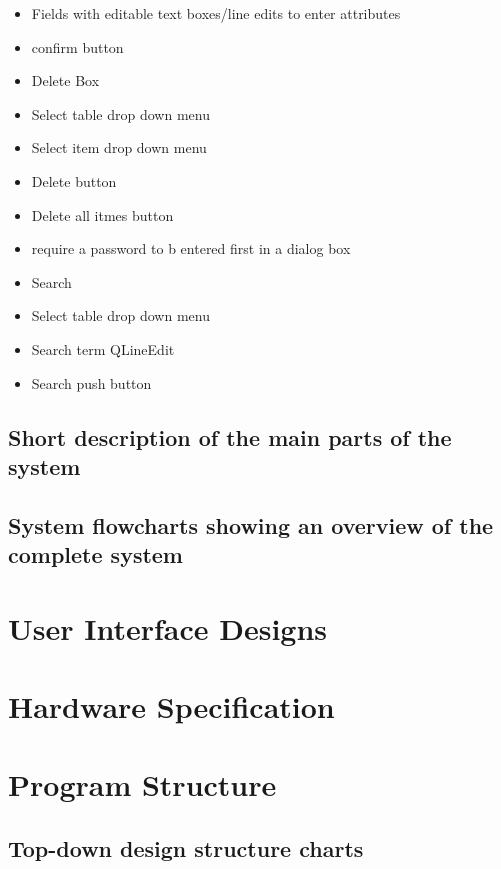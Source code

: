 \begin {itemize}
\begin {itemize}
\begin {itemize}
		\item Fields with editable text boxes/line edits to enter attributes
		\item confirm button
	\item Delete Box
		\item Select table drop down menu
		\item Select item drop down menu
		\item Delete button
		\item Delete all itmes button
		\item require a password to b entered first in a dialog box
	\item Search
		\item Select table drop down menu
		\item Search term QLineEdit
		\item Search push button
		
		\end {itemize}
	\end {itemize}
\end {itemize}

\subsection{Short description of the main parts of the system}






\subsection{System flowcharts showing an overview of the complete system}

\section{User Interface Designs}

\section{Hardware Specification}

\section{Program Structure}

\subsection{Top-down design structure charts}

